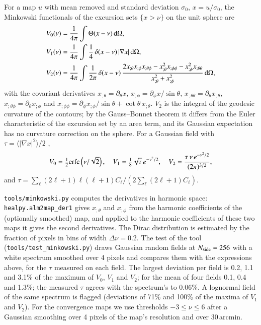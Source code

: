 \documentclass{aa}
\newcommand{\nside}{N_{\rm side}}
\begin{document}
For a map $u$ with mean removed and standard deviation $\sigma_0$, $x=u/\sigma_0$, the Minkowski functionals of the excursion sets $\{x>\nu\}$ on the unit sphere are \citep{schmalzing1998}
\begin{align}
V_0(\nu) &= \frac{1}{4\pi}\int \Theta(x-\nu)\,{\rm d}\Omega, \\
V_1(\nu) &= \frac{1}{4\pi}\int \frac{1}{4}\,\delta(x-\nu)\,|\nabla x|\,{\rm d}\Omega, \\
V_2(\nu) &= \frac{1}{4\pi}\int \frac{1}{2\pi}\,\delta(x-\nu)\,\frac{2x_{;\theta}x_{;\phi}x_{;\theta\phi}-x_{;\theta}^2x_{;\phi\phi}-x_{;\phi}^2x_{;\theta\theta}}{x_{;\theta}^2+x_{;\phi}^2}\,{\rm d}\Omega,
\end{align}
with the covariant derivatives $x_{;\theta}=\partial_\theta x$, $x_{;\phi}=\partial_\phi x/\sin\theta$, $x_{;\theta\theta}=\partial_\theta x_{;\theta}$, $x_{;\theta\phi}=\partial_\theta x_{;\phi}$ and $x_{;\phi\phi}=\partial_\phi x_{;\phi}/\sin\theta + \cot\theta\,x_{;\theta}$. $V_2$ is the integral of the geodesic curvature of the contours; by the Gauss--Bonnet theorem it differs from the Euler characteristic of the excursion set by an area term, and its Gaussian expectation has no curvature correction on the sphere. For a Gaussian field with $\tau = \langle|\nabla x|^2\rangle/2$ \citep{tomita1986},
\begin{equation}
V_0 = \tfrac{1}{2}{\rm erfc}\left(\nu/\sqrt{2}\right),\quad
V_1 = \tfrac{1}{8}\sqrt{\tau}\,e^{-\nu^2/2},\quad
V_2 = \frac{\tau\,\nu\,e^{-\nu^2/2}}{(2\pi)^{3/2}},
\end{equation}
and $\tau = \sum_\ell (2\ell+1)\ell(\ell+1)C_\ell \big/ \left(2\sum_\ell(2\ell+1)C_\ell\right)$.

\texttt{tools/minkowski.py} computes the derivatives in harmonic space: \texttt{healpy.alm2map\_der1} gives $x_{;\theta}$ and $x_{;\phi}$ from the harmonic coefficients of the (optionally smoothed) map, and applied to the harmonic coefficients of these two maps it gives the second derivatives. The Dirac distribution is estimated by the fraction of pixels in bins of width $\Delta\nu=0.2$. The test of the tool (\texttt{tools/test\_minkowski.py}) draws Gaussian random fields at $\nside=256$ with a white spectrum smoothed over 4 pixels and compares them with the expressions above, for the $\tau$ measured on each field. The largest deviation per field is 0.2, 1.1 and 3.1\% of the maximum of $V_0$, $V_1$ and $V_2$; for the mean of four fields 0.1, 0.4 and 1.3\%; the measured $\tau$ agrees with the spectrum's to 0.06\%. A lognormal field of the same spectrum is flagged (deviations of 71\% and 100\% of the maxima of $V_1$ and $V_2$). For the convergence maps we use thresholds $-3\le\nu\le6$ after a Gaussian smoothing over 4 pixels of the map's resolution and over 30\,arcmin.
\end{document}
